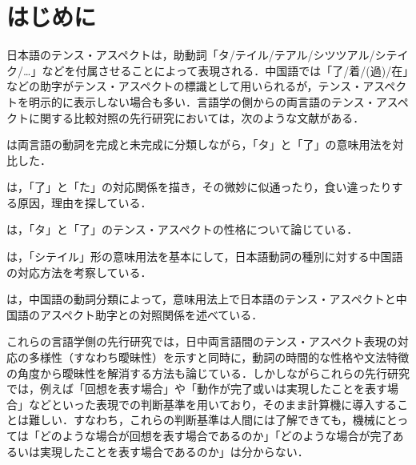 

\maketitle
\thispagestyle{empty}

\section{はじめに}
日本語のテンス・アスペクトは，助動詞「タ/テイル/テアル/シツツアル/シテイク/…」などを付属させることによって表現される．中国語では「了/着/(過)/在」などの助字がテンス・アスペクトの標識として用いられるが，テンス・アスペクトを明示的に表示しない場合も多い．言語学の側からの両言語のテンス・アスペクトに関する比較対照の先行研究においては，次のような文献がある．

\begin{enumerater}
\renewcommand{\labelenumi}{}
\renewcommand{\theenumi}{}
\item \cite{Ryu1987}は両言語の動詞を完成と未完成に分類しながら，「タ」と「了」の意味用法を対比した．
\item \cite{Cho1985}は，「了」と「た」の対応関係を描き，その微妙に似通ったり，食い違ったりする原因，理由を探している．
\item \cite{Shu1989}は，「タ」と「了」のテンス・アスペクトの性格について論じている．
\item \cite{Oh1996}は，「シテイル」形の意味用法を基本にして，日本語動詞の種別に対する中国語の対応方法を考察している．
\item \cite{Ryu2000}は，中国語の動詞分類によって，意味用法上で日本語のテンス・アスペクトと中国語のアスペクト助字との対照関係を述べている．\\
\end{enumerater}

これらの言語学側の先行研究では，日中両言語間のテンス・アスペクト表現の対応の多様性（すなわち曖昧性）を示すと同時に，動詞の時間的な性格や文法特徴の角度から曖昧性を解消する方法も論じている．しかしながらこれらの先行研究では，例えば「回想を表す場合」や「動作が完了或いは実現したことを表す場合」などといった表現での判断基準を用いており，そのまま計算機に導入することは難しい．すなわち，これらの判断基準は人間には了解できても，機械にとっては「どのような場合が回想を表す場合であるのか」「どのような場合が完了あるいは実現したことを表す場合であるのか」は分からない．

